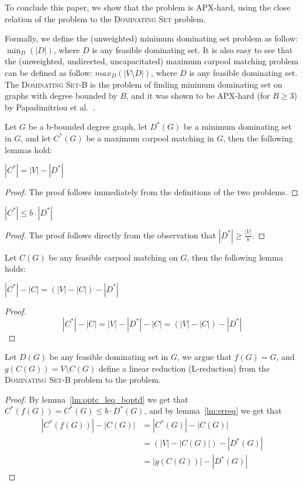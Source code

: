 \label{sec:hardness}
To conclude this paper, we show that the \textsc{\CARPOOL{}} problem is APX-hard,
using the close relation of the problem to the \textsc{Dominating Set} problem.

Formally, we define the (unweighted) minimum dominating set problem as follow:
$\min_{D}(|D|)$,
where $D$ is any feasible dominating set.
It is also easy to see that the (unweighted, undirected, uncapacitated) 
maximum carpool matching problem can be defined as follow: 
$max_{D}(|V \setminus D|)$, 
where $D$ is any feasible dominating set.
The \textsc{Dominating Set-B} is the problem of finding minimum dominating set on 
graphs with degree bounded by $B$,
and it was shown to be APX-hard (for $B \geq 3$) by 
Papadimitriou et al.~\cite{papadimitriou1988optimization}.

Let $G$ be a b-bounded degree graph,
let $D^*(G)$ be a minimum dominating set in $G$,
and let $C^*(G)$ be a maximum carpool matching in $G$, 
then the following lemmas hold:

\begin{lemma}
$|C^*| = |V| - |D^*|$
\end{lemma}

\begin{proof}
The proof follows immediately from the definitions of the two problems. 
\end{proof}

\begin{lemma}
\label{lm:optc_leq_boptd}
$|C^*| \leq b \cdot |D^*|$
\end{lemma}

\begin{proof}
The proof follows directly from the observation that $|D^*| \geq \frac{|V|}{b}$.
\end{proof}

Let $C(G)$ be any feasible carpool matching on $G$, then the following lemma holds:

\begin{lemma}
\label{lm:erreq}
$|C^*| - |C| = (|V| - |C|) - |D^*|$
\end{lemma}

\begin{proof}
$$
|C^*| - |C| 				= 
|V| - |D^*| - |C| 	= 
(|V| - |C|) - |D^*|
$$
\end{proof}

Let $D(G)$ be any feasible dominating set in $G$, 
we argue that $f(G) = G$, and $g(C(G)) = V \setminus C(G)$ 
define a linear reduction (L-reduction) from the \textsc{Dominating Set-B} problem to the 
\textsc{\CARPOOL{}} problem.
\begin{proof}
By lemma~\ref{lm:optc_leq_boptd} we get that $C^*(f(G)) = C^*(G) \leq b \cdot D^*(G)$,
and by lemma~\ref{lm:erreq} we get that 
\begin{equation}
\begin{split}
|C^*(f(G))| - |C(G)|		& = |C^*(G)| - |C(G)| 			\\
							& = (|V| - |C(G)|) - |D^*(G)|	\\
							& = |g(C(G))| - |D^*(G)|
\end{split}
\end{equation}
\end{proof}

